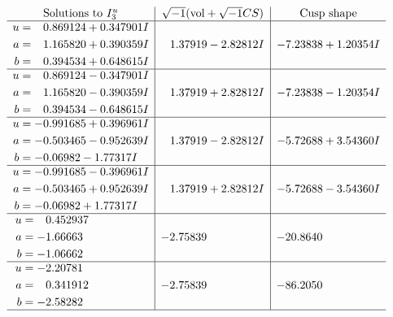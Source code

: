 \documentclass[1p]{elsarticle_modified}
\theoremstyle{definition}
\newcommand{\I}{\sqrt{-1}}
\begin{document}
$$\begin{array}{c|c|c}  
\text{Solutions to }I^u_{3}& \I (\text{vol} + \sqrt{-1}CS) & \text{Cusp shape}\\
 \hline 
\begin{aligned}
u &= \phantom{-}0.869124 + 0.347901 I \\
a &= \phantom{-}1.165820 + 0.390359 I \\
b &= \phantom{-}0.394534 + 0.648615 I\end{aligned}
 & \phantom{-}1.37919 - 2.82812 I & -7.23838 + 1.20354 I \\ \hline\begin{aligned}
u &= \phantom{-}0.869124 - 0.347901 I \\
a &= \phantom{-}1.165820 - 0.390359 I \\
b &= \phantom{-}0.394534 - 0.648615 I\end{aligned}
 & \phantom{-}1.37919 + 2.82812 I & -7.23838 - 1.20354 I \\ \hline\begin{aligned}
u &= -0.991685 + 0.396961 I \\
a &= -0.503465 - 0.952639 I \\
b &= -0.06982 - 1.77317 I\end{aligned}
 & \phantom{-}1.37919 - 2.82812 I & -5.72688 + 3.54360 I \\ \hline\begin{aligned}
u &= -0.991685 - 0.396961 I \\
a &= -0.503465 + 0.952639 I \\
b &= -0.06982 + 1.77317 I\end{aligned}
 & \phantom{-}1.37919 + 2.82812 I & -5.72688 - 3.54360 I \\ \hline\begin{aligned}
u &= \phantom{-}0.452937\phantom{ +0.000000I} \\
a &= -1.66663\phantom{ +0.000000I} \\
b &= -1.06662\phantom{ +0.000000I}\end{aligned}
 & -2.75839\phantom{ +0.000000I} & -20.8640\phantom{ +0.000000I} \\ \hline\begin{aligned}
u &= -2.20781\phantom{ +0.000000I} \\
a &= \phantom{-}0.341912\phantom{ +0.000000I} \\
b &= -2.58282\phantom{ +0.000000I}\end{aligned}
 & -2.75839\phantom{ +0.000000I} & -86.2050\phantom{ +0.000000I}\\
 \hline 
 \end{array}$$\newpage
\end{document}
